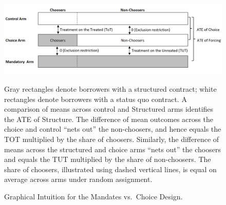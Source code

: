 \documentclass[12pt, a4paper, colorinlistoftodos]{article}
\begin{document}
\begin{figure}
\caption{Graphical Intuition for the Mandates vs.\ Choice Design.} 
    \begin{center}
        \centering
        \includegraphics[width=1.0\textwidth]{Figuras/tot_tut_graph.png}
    \end{center}
 \scriptsize{
    Gray rectangles denote borrowers with a structured contract; white rectangles denote borrowers with a status quo contract. 
    A comparison of means across control and Structured arms identifies the ATE of Structure. 
    The difference of mean outcomes across the choice and control ``nets out'' the non-choosers, and hence equals the TOT multiplied by the share of choosers.
    Similarly, the difference of means across the structured and choice arms ``nets out'' the choosers and equals the TUT multiplied by the share of non-choosers.
        The share of choosers, illustrated using dashed vertical lines, is equal on average across arms under random assignment.}
    \label{tot_tut_graph}
\end{figure}   
\end{document}
